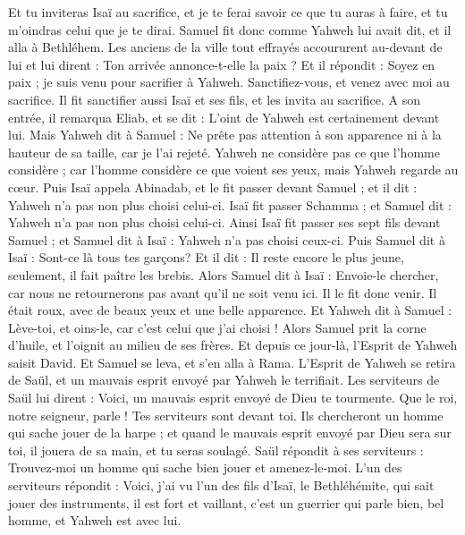 \begin{multicols}{2}
Et tu inviteras Isaï au sacrifice, et je te ferai savoir ce que tu auras à faire, et tu m'oindras celui que je te dirai.
Samuel fit donc comme Yahweh lui avait dit, et il alla à Bethléhem. Les anciens de la ville tout effrayés accoururent au-devant de lui et lui dirent : Ton arrivée annonce-t-elle la paix ?
Et il répondit : Soyez en paix ; je suis venu pour sacrifier à Yahweh. Sanctifiez-vous, et venez avec moi au sacrifice. Il fit sanctifier aussi Isaï et ses fils, et les invita au sacrifice.
A son entrée, il remarqua Eliab, et se dit : L'oint de Yahweh est certainement devant lui.
Mais Yahweh dit à Samuel : Ne prête pas attention à son apparence ni à la hauteur de sa taille, car je l'ai rejeté. Yahweh ne considère pas ce que l'homme considère ; car l'homme considère ce que voient ses yeux, mais Yahweh regarde au cœur.
Puis Isaï appela Abinadab, et le fit passer devant Samuel ; et il dit : Yahweh n'a pas non plus choisi celui-ci.
Isaï fit passer Schamma ; et Samuel dit : Yahweh n'a pas non plus choisi celui-ci.
Ainsi Isaï fit passer ses sept fils devant Samuel ; et Samuel dit à Isaï : Yahweh n'a pas choisi ceux-ci.
Puis Samuel dit à Isaï : Sont-ce là tous tes garçons? Et il dit : Il reste encore le plus jeune, seulement, il fait paître les brebis. Alors Samuel dit à Isaï : Envoie-le chercher, car nous ne retournerons pas avant qu'il ne soit venu ici.
Il le fit donc venir. Il était roux, avec de beaux yeux et une belle apparence. Et Yahweh dit à Samuel : Lève-toi, et oins-le,  car c'est celui que j'ai choisi !
Alors Samuel prit la corne d'huile, et l'oignit au milieu de ses frères. Et depuis ce jour-là, l'Esprit de Yahweh saisit David. Et Samuel se leva, et s'en alla à Rama.
L'Esprit de Yahweh se retira de Saül, et un mauvais esprit envoyé par Yahweh le terrifiait.
Les serviteurs de Saül lui dirent : Voici, un mauvais esprit envoyé de Dieu te tourmente.
Que le roi, notre seigneur, parle ! Tes serviteurs sont devant toi. Ils chercheront un homme qui sache jouer de la harpe ; et quand le mauvais esprit envoyé par Dieu sera sur toi, il jouera de sa main, et tu seras soulagé.
Saül répondit à ses serviteurs : Trouvez-moi un homme qui sache bien jouer et amenez-le-moi.
L'un des serviteurs répondit : Voici, j'ai vu l'un des fils d'Isaï, le Bethléhémite, qui sait jouer des instruments, il est fort et vaillant, c'est un guerrier qui parle bien, bel homme, et Yahweh est avec lui.

\end{multicols}
